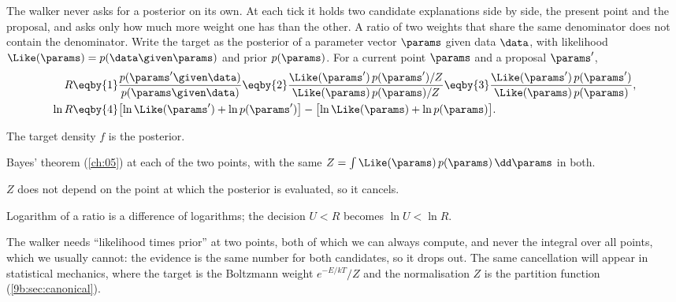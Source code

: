 The walker never asks for a posterior on its own. At each tick it holds two candidate
explanations side by side, the present point and the proposal, and asks only how much more
weight one has than the other. A ratio of two weights that share the same denominator does not
contain the denominator. Write the target as the posterior of a parameter vector $\params$
given data $\data$, with likelihood $\Like(\params)=p(\data\given\params)$ and prior
$p(\params)$. For a current point $\params$ and a proposal $\params'$,
\begin{align}
  R
  &\eqby{1}\frac{p(\params'\given\data)}{p(\params\given\data)}
   \eqby{2}\frac{\Like(\params')\,p(\params')/Z}{\Like(\params)\,p(\params)/Z}
   \eqby{3}\frac{\Like(\params')\,p(\params')}{\Like(\params)\,p(\params)},
  \nonumber\\
  \ln R
  &\eqby{4}\bigl[\ln\Like(\params')+\ln p(\params')\bigr]
     -\bigl[\ln\Like(\params)+\ln p(\params)\bigr].
  \label{9b:eq:ratio}
\end{align}
\begin{explain}
  \item The target density $f$ is the posterior.
  \item Bayes' theorem (\cref{ch:05}) at each of the two points, with the same $Z=\int
        \Like(\params)\,p(\params)\,\dd\params$ in both.
  \item $Z$ does not depend on the point at which the posterior is evaluated, so it cancels.
  \item Logarithm of a ratio is a difference of logarithms; the decision $U<R$ becomes
        $\ln U<\ln R$.
\end{explain}
The walker needs ``likelihood times prior'' at two points, both of which we can always compute,
and never the integral over all points, which we usually cannot: the evidence is the same
number for both candidates, so it drops out. The same cancellation will appear in statistical mechanics,
where the target is the Boltzmann weight $e^{-E/kT}/Z$ and the normalisation $Z$ is the
partition function (\cref{9b:sec:canonical}).

